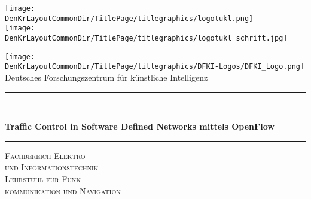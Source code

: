 
\newcommand{\HRule}{\rule{\linewidth}{0.5mm}}


\begin{titlepage}

\begin{center}


\begin{minipage}{0.4\textwidth}
\begin{flushleft}
\texttt{[image: \\DenKrLayoutCommonDir/TitlePage/titlegraphics/logotukl.png]}\\
\texttt{[image: \\DenKrLayoutCommonDir/TitlePage/titlegraphics/logotukl\_schrift.jpg]}\\
\textsc{\Large }
\end{flushleft}
\end{minipage}
\hfill
\begin{minipage}{0.4\textwidth}
\begin{flushright}
\texttt{[image: \\DenKrLayoutCommonDir/TitlePage/titlegraphics/DFKI-Logos/DFKI\_Logo.png]}\\
{\Large\sffamily%
Deutsches Forschungszentrum für künstliche Intelligenz}
\end{flushright}
\end{minipage}

\vspace{0.07\textheight}

\begin{spacing}{1.2}
\textsc{\LARGE\DenKrTPpublicationType}
\end{spacing}

\vspace{0.02\textheight}


\HRule \\[0.2\baselineskip]
\begin{spacing}{1}
\huge\bfseries
Traffic Control in Software Defined Networks mittels OpenFlow
\\[0\baselineskip]
\end{spacing}
\HRule

\vspace{0.01\textheight}

\begin{center}
\textsc{\large Fachbereich Elektro-\\ und Informationstechnik}\\
\textsc{\large Lehrstuhl für Funk-\\ kommunikation und Navigation}
\end{center}


\end{center}
\end{titlepage}
